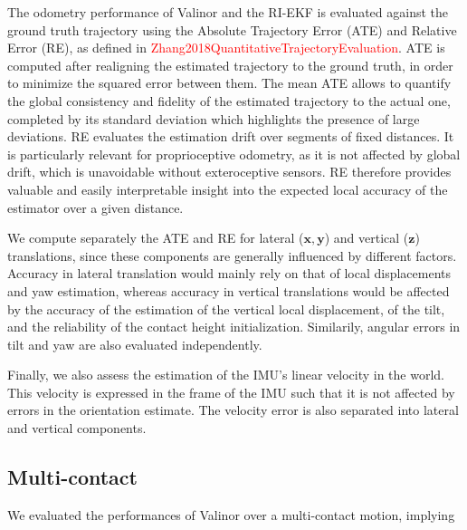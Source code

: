 \documentclass{IJCAS}
\begin{document}
The odometry performance of Valinor and the RI-EKF is evaluated against the ground truth trajectory using the Absolute Trajectory Error (ATE) and Relative Error (RE), as defined in \textcolor{red}{Zhang2018QuantitativeTrajectoryEvaluation}. ATE is computed after realigning the estimated trajectory to the ground truth, in order to minimize the squared error between them. The mean ATE allows to quantify the global consistency and fidelity of the estimated trajectory to the actual one, completed by its standard deviation which highlights the presence of large deviations. RE evaluates the estimation drift over segments of fixed distances. It is particularly relevant for proprioceptive odometry, as it is not affected by global drift, which is unavoidable without exteroceptive sensors. RE therefore provides valuable and easily interpretable insight into the expected local accuracy of the estimator over a given distance.

We compute separately the ATE and RE for lateral ($\boldsymbol{x}, \boldsymbol{y}$) and vertical ($\boldsymbol{z}$) translations, since these components are generally influenced by different factors. Accuracy in lateral translation would mainly rely on that of local displacements and yaw estimation, whereas accuracy in vertical translations would be affected by the accuracy of the estimation of the vertical local displacement, of the tilt, and the reliability of the contact height initialization. Similarily, angular errors in tilt and yaw are also evaluated independently.

Finally, we also assess the estimation of the IMU's linear velocity in the world. This velocity is expressed in the frame of the IMU such that it is not affected by errors in the orientation estimate. The velocity error is also separated into lateral and vertical components.

\subsection{Multi-contact}

We evaluated the performances of Valinor over a multi-contact motion, implying 
\end{document}
